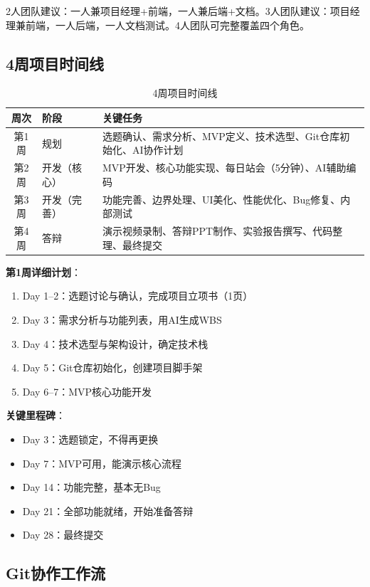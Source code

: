 2人团队建议：一人兼项目经理+前端，一人兼后端+文档。3人团队建议：项目经理兼前端，一人后端，一人文档测试。4人团队可完整覆盖四个角色。

\subsection{4周项目时间线}

\begin{table}[H]
\centering
\small
\begin{tabular}{clp{7cm}}
\toprule
\textbf{周次} & \textbf{阶段} & \textbf{关键任务} \\
\midrule
第1周 & 规划 & 选题确认、需求分析、MVP定义、技术选型、Git仓库初始化、AI协作计划 \\
第2周 & 开发（核心） & MVP开发、核心功能实现、每日站会（5分钟）、AI辅助编码 \\
第3周 & 开发（完善） & 功能完善、边界处理、UI美化、性能优化、Bug修复、内部测试 \\
第4周 & 答辩 & 演示视频录制、答辩PPT制作、实验报告撰写、代码整理、最终提交 \\
\bottomrule
\end{tabular}
\caption{4周项目时间线}
\end{table}

\textbf{第1周详细计划}：

\begin{enumerate}[leftmargin=2em]
  \item Day 1--2：选题讨论与确认，完成项目立项书（1页）
  \item Day 3：需求分析与功能列表，用AI生成WBS
  \item Day 4：技术选型与架构设计，确定技术栈
  \item Day 5：Git仓库初始化，创建项目脚手架
  \item Day 6--7：MVP核心功能开发
\end{enumerate}

\textbf{关键里程碑}：

\begin{itemize}[leftmargin=2em]
  \item Day 3：选题锁定，不得再更换
  \item Day 7：MVP可用，能演示核心流程
  \item Day 14：功能完整，基本无Bug
  \item Day 21：全部功能就绪，开始准备答辩
  \item Day 28：最终提交
\end{itemize}

\subsection{Git协作工作流}

